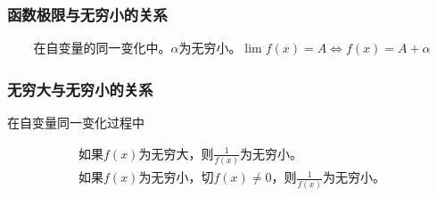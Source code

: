 \subsubsection{函数极限与无穷小的关系}
\begin{align}
    \mbox{在自变量的同一变化中。$\alpha$为无穷小。}\lim f(x)=A\Leftrightarrow f(x)=A+\alpha \label{limit_infinitesimal}
\end{align}
\subsubsection{无穷大与无穷小的关系} 
在自变量同一变化过程中
\begin{center}
    \begin{align}
        \mbox{如果$f(x)$为无穷大，则$\frac{1}{f(x)}$为无穷小。}\label{Infinity_infinitesimal}\\ 
        \mbox{如果$f(x)$为无穷小，切$f(x)\neq 0$，则$\frac{1}{f(x)}$为无穷小。}
    \end{align}
\end{center}
